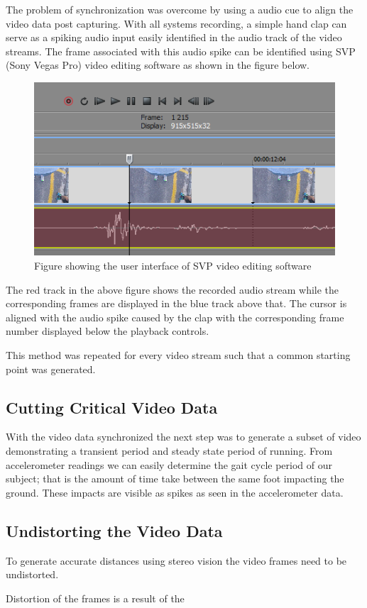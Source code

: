 The problem of synchronization was overcome by using a audio cue to align the video data post capturing. With all systems recording, a simple hand clap can serve as a spiking audio input easily identified in the audio track of the video streams. The frame associated with this audio spike can be identified using SVP (Sony Vegas Pro) video editing software as shown in the figure below. 

\begin{figure}[!ht]
\centering
  \includegraphics[width=0.5\linewidth]{figures/svpframe.png}
  \caption{Figure showing the user interface of SVP video editing software}
  \label{fig:svpframe}
\end{figure}

The red track in the above figure shows the recorded audio stream while the corresponding frames are displayed in the blue track above that. The cursor is aligned with the audio spike caused by the clap with the corresponding frame number displayed below the playback controls.

This method was repeated for every video stream such that a common starting point was generated. 

\subsection{Cutting Critical Video Data}
With the video data synchronized the next step was to generate a subset of video demonstrating a transient period and steady state period of running. From accelerometer readings we can easily determine the gait cycle period of our subject; that is the amount of time take between the same foot impacting the ground. These impacts are visible as spikes as seen in the accelerometer data.  

\subsection{Undistorting the Video Data}
To generate accurate distances using stereo vision the video frames need to be undistorted.

Distortion of the frames is a result of the 

